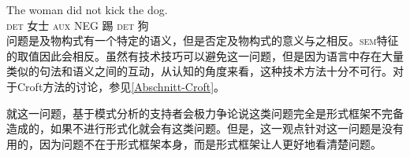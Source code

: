 \ea
\gll The woman did not kick the dog.\\
    \textsc{det} 女士 \textsc{aux} NEG 踢 \textsc{det} 狗\\
\z
问题是及物构式有一个特定的语义，但是否定及物构式的意义与之相反。\textsc{sem}特征的取值因此会相反。虽然有技术技巧可以避免这一问题，但是因为语言中存在大量类似的句法和语义之间的互动，从认知的角度来看，这种技术方法十分不可行\citep{Mueller2006d,Mueller2007d,MuellerLehrbuch1,MuellerPersian,MWArgSt}。对于Croft方法的讨论，参见\ref{Abschnitt-Croft}。

就这一问题，基于模式分析的支持者会极力争论说这类问题完全是形式框架不完备造成的，如果不进行形式化就会有这类问题\citep[\S~5]{Goldberg2009a}。但是，这一观点针对这一问题是没有用的，因为问题不在于形式框架本身，而是形式框架让人更好地看清楚问题。

